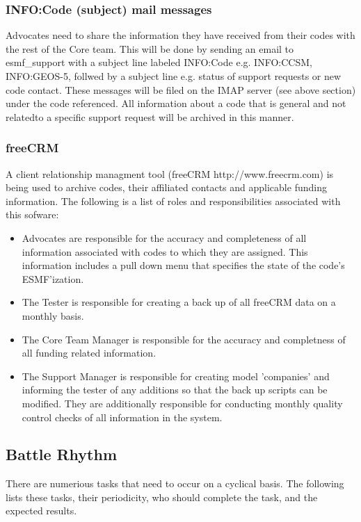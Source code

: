 \subsubsection{INFO:Code (subject) mail messages}
Advocates need to share the information they have received from their codes with the rest of the Core team. This will be done by sending an email to esmf\_support with a subject line labeled INFO:Code e.g. INFO:CCSM, INFO:GEOS-5, follwed by a subject line e.g. status of support requests or new code contact.  These messages will be filed on the IMAP server (see above section) under the code referenced. All information about a code that is general and not relatedto a specific support request will be archived in this manner. 

\subsubsection{freeCRM}
A client relationship managment tool (freeCRM http://www.freecrm.com) is being used to archive codes, their affiliated contacts and applicable funding information. The following is a list of roles and responsibilities associated with this sofware:
\begin{itemize}
\item Advocates are responsible for the accuracy and completeness of all information associated with codes to which they are assigned.  This information includes a pull down menu that specifies the state of the code's ESMF'ization.
\item The Tester is responsible for creating a back up of all freeCRM data on a monthly basis.
\item The Core Team Manager is responsible for the accuracy and completness of all funding related information.
\item The Support Manager is responsible for creating model 'companies' and informing the tester of any additions so that the back up scripts can be modified. They are additionally responsible for conducting monthly quality control checks of all information in the system.  
\end{itemize} 

\subsection{Battle Rhythm}
There are numerious tasks that need to occur on a cyclical basis. The following lists these tasks, their periodicity, who should complete the task, and the expected results.

